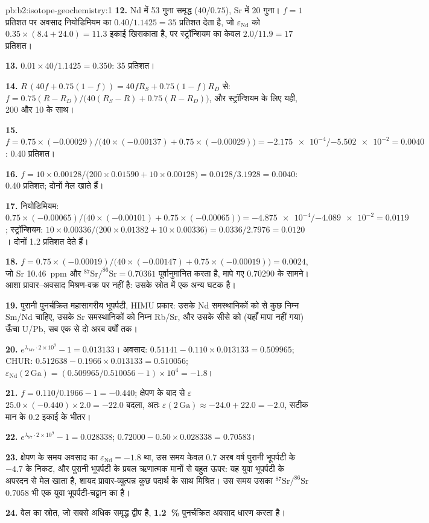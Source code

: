 \begin{solution}{pb:b2:isotope-geochemistry:1}
\textbf{12.} Nd में 53 गुना समृद्ध ($40/0.75$), Sr में 20 गुना। $f = 1$ प्रतिशत पर
अवसाद नियोडिमियम का $0.40/1.1425 = 35$ प्रतिशत देता है, जो
$\varepsilon_{\mathrm{Nd}}$ को $0.35\times(8.4 + 24.0) = 11.3$ इकाई खिसकाता है, पर स्ट्रॉन्शियम का केवल $2.0/11.9 =
17$ प्रतिशत।

\textbf{13.} $0.01\times40/1.1425 = 0.350$: 35 प्रतिशत।

\textbf{14.} $R\,(40f + 0.75(1-f)) = 40fR_S + 0.75(1-f)R_D$ से:
$f = 0.75(R - R_D)/\bigl(40(R_S - R) + 0.75(R - R_D)\bigr)$, और स्ट्रॉन्शियम के लिए यही, 200
और 10 के साथ।

\textbf{15.} $f = 0.75\times(-0.00029)/\bigl(40\times(-0.00137) + 0.75\times(-0.00029)\bigr)
= \num{-2.175e-4}/\num{-5.502e-2} = 0.0040$: 0.40 प्रतिशत।

\textbf{16.} $f = 10\times0.00128/\bigl(200\times0.01590 + 10\times0.00128\bigr) =
0.0128/3.1928 = 0.0040$: 0.40 प्रतिशत; दोनों मेल खाते हैं।

\textbf{17.} नियोडिमियम: $0.75\times(-0.00065)/\bigl(40\times(-0.00101) +
0.75\times(-0.00065)\bigr) = \num{-4.875e-4}/\num{-4.089e-2} = 0.0119$; स्ट्रॉन्शियम:
$10\times0.00336/\bigl(200\times0.01382 + 10\times0.00336\bigr) = 0.0336/2.7976 = 0.0120$।
दोनों 1.2 प्रतिशत देते हैं।

\textbf{18.} $f = 0.75\times(-0.00019)/\bigl(40\times(-0.00147) + 0.75\times(-0.00019)\bigr)
= 0.0024$, जो Sr \qty{10.46}{ppm} और $^{87}\mathrm{Sr}/^{86}\mathrm{Sr} =
0.70361$ पूर्वानुमानित करता है, मापे गए 0.70290 के सामने। आशा प्रावार--अवसाद मिश्रण-वक्र पर नहीं है:
उसके स्रोत में एक अन्य घटक है।

\textbf{19.} पुरानी पुनर्चक्रित महासागरीय भूपर्पटी, HIMU प्रकार: उसके Nd समस्थानिकों को  से
कुछ निम्न Sm/Nd चाहिए, उसके Sr समस्थानिकों को निम्न Rb/Sr, और उसके
सीसे को (यहाँ मापा नहीं गया) ऊँचा U/Pb, सब एक से दो अरब वर्षों तक।

\textbf{20.} $e^{\lambda_{147}\cdot2\times10^9} - 1 = 0.013133$। अवसाद: $0.51141 -
0.110\times0.013133 = 0.509965$; CHUR: $0.512638 - 0.1966\times0.013133 = 0.510056$;
$\varepsilon_{\mathrm{Nd}}(2\,\mathrm{Ga}) = (0.509965/0.510056 - 1)\times10^4 = -1.8$।

\textbf{21.} $f = 0.110/0.1966 - 1 = -0.440$; क्षेपण के बाद से $\varepsilon$
$25.0\times(-0.440)\times2.0 = -22.0$ बदला, अतः $\varepsilon(2\,\mathrm{Ga}) \approx -24.0 + 22.0
= -2.0$, सटीक मान के 0.2 इकाई के भीतर।

\textbf{22.} $e^{\lambda_{87}\cdot2\times10^9} - 1 = 0.028338$;
$0.72000 - 0.50\times0.028338 = 0.70583$।

\textbf{23.} क्षेपण के समय अवसाद का $\varepsilon_{\mathrm{Nd}} = -1.8$ था, उस समय केवल
0.7 अरब वर्ष पुरानी भूपर्पटी के $-4.7$ के निकट, और पुरानी भूपर्पटी के
प्रबल ऋणात्मक मानों से बहुत ऊपर: यह युवा भूपर्पटी के अपरदन से मेल खाता है, शायद
प्रावार-व्युत्पन्न कुछ पदार्थ के साथ मिश्रित। उस समय उसका $^{87}\mathrm{Sr}/^{86}\mathrm{Sr}$
0.7058 भी एक युवा भूपर्पटी-चट्टान का है।

\textbf{24.} वेल का स्रोत, जो सबसे अधिक समृद्ध द्वीप है,
\textbf{\qty[text-series-to-math=true]{1.2}{\percent}} पुनर्चक्रित अवसाद धारण करता है।
\end{solution}
